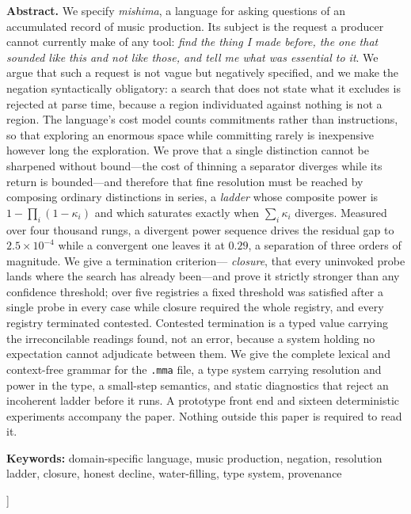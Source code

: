 \documentclass[11pt,twocolumn,a4paper]{article}
\theoremstyle{definition}
\theoremstyle{remark}
\newcommand{\pot}{\kappa}
\begin{document}
\begin{@twocolumnfalse}
\begin{center}
\begin{minipage}{0.92\textwidth}
\textbf{Abstract.}
We specify \emph{mishima}, a language for asking questions of an accumulated
record of music production. Its subject is the request a producer cannot
currently make of any tool: \emph{find the thing I made before, the one that
sounded like this and not like those, and tell me what was essential to it}. We
argue that such a request is not vague but negatively specified, and we make the
negation syntactically obligatory: a search that does not state what it excludes
is rejected at parse time, because a region individuated against nothing is not a
region. The language's cost model counts commitments rather than instructions, so
that exploring an enormous space while committing rarely is inexpensive however
long the exploration. We prove that a single distinction cannot be sharpened
without bound---the cost of thinning a separator diverges while its return is
bounded---and therefore that fine resolution must be reached by composing
ordinary distinctions in series, a \emph{ladder} whose composite power is
$1-\prod_i(1-\pot_i)$ and which saturates exactly when $\sum_i \pot_i$ diverges.
Measured over four thousand rungs, a divergent power sequence drives the residual
gap to $2.5\times10^{-4}$ while a convergent one leaves it at $0.29$, a
separation of three orders of magnitude. We give a termination criterion---%
\emph{closure}, that every uninvoked probe lands where the search has already
been---and prove it strictly stronger than any confidence threshold; over five
registries a fixed threshold was satisfied after a single probe in every case
while closure required the whole registry, and every registry terminated
contested. Contested termination is a typed value carrying the irreconcilable
readings found, not an error, because a system holding no expectation cannot
adjudicate between them. We give the complete lexical and context-free grammar
for the \texttt{.mma} file, a type system carrying resolution and power in the
type, a small-step semantics, and static diagnostics that reject an incoherent
ladder before it runs. A prototype front end and sixteen deterministic
experiments accompany the paper. Nothing outside this paper is required to read
it.
\end{minipage}

\vspace{8pt}
\noindent\textbf{Keywords:}
domain-specific language, music production, negation, resolution ladder,
closure, honest decline, water-filling, type system, provenance

\vspace{18pt}
\end{center}
\end{@twocolumnfalse}
]
\end{document}
